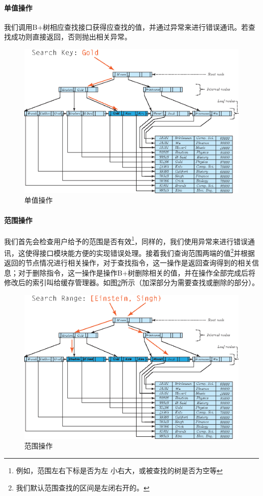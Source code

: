 \documentclass[UTF8]{ctexrep} %
\begin{document}
\paragraph{单值操作}
我们调用B+树相应查找接口获得应查找的值，并通过异常来进行错误通讯。若查找成功则直接返回，否则抛出相关异常。
\begin{figure}[H]
    \centering
    \includegraphics[width=0.75\linewidth]{figure/search_delete_single.eps}
    \caption{单值操作}
    \label{fig:search_delete_single}
\end{figure}


\paragraph{范围操作}
我们首先会检查用户给予的范围是否有效\footnote{例如，范围左右下标是否为左 小右大，或被查找的树是否为空等}，同样的，我们使用异常来进行错误通讯，这使得接口模块能方便的实现错误处理。接着我们查询范围两端的值\footnote{我们默认范围查找的区间是左闭右开的。}并根据返回的节点情况进行相关操作，对于查找指令，这一操作是返回查询得到的相关信息；对于删除指令，这一操作是操作B+树删除相关的值，并在操作全部完成后将修改后的索引叫给缓存管理器。如图\ref{fig:search_delete_multi}所示（加深部分为需要查找或删除的部分）。

\begin{figure}[H]
    \centering
    \includegraphics[width=0.75\linewidth]{figure/search_delete_multi.eps}
    \caption{范围操作}
    \label{fig:search_delete_multi}
\end{figure}
\end{document}
